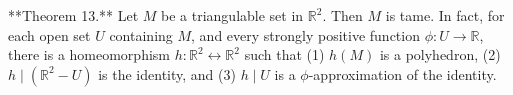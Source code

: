 **Theorem 13.** Let $M$ be a triangulable set in $\mathbb{R}^2$. Then $M$ is tame. In fact, for each open set $U$ containing $M$, and every strongly positive function $\phi: U \rightarrow \mathbb{R}$, there is a homeomorphism $h: \mathbb{R}^2 \leftrightarrow \mathbb{R}^2$ such that (1) $h(M)$ is a polyhedron, (2) $h \mid (\mathbb{R}^2 - U)$ is the identity, and (3) $h \mid U$ is a $\phi$-approximation of the identity.
